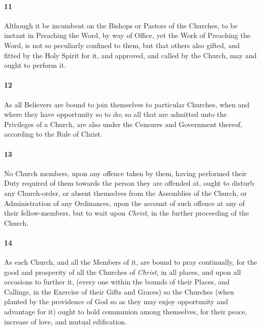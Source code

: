 \documentclass[
    paper=letterpaper,
    11pt,
    twoside,
    DIV=calc,
    openany
]{scrbook}
\newcommand{\oldgrammar}[2]{#2}
\begin{document}
\paragraph{11} %
Although it be incumbent on the Bishops or Pastors of the Churches, to be instant in Preaching the Word, by way of Office, yet the Work of Preaching the Word, is not so peculiarly confined to them, but that others also \R{}gifted, and fitted by the Holy Spirit for it, and approved, and called by the Church, may and ought to perform it.

\footnotebegin
{}
\footnoteend

\paragraph{12} %
As all Believers are bound to \oldgrammar{joyn}{join} themselves to particular Churches, when and where they have opportunity so to do; so all that are admitted unto the Privileges of a Church, are also \R{}under the Censures and Government thereof, according to the Rule of Christ.

\footnotebegin
{}
\footnoteend

\paragraph{13} %
No Church members, upon any offence taken by them, having performed their Duty required of them towards the person they are offended at, ought to disturb any Church-order, or absent themselves from the Assemblies of the Church, or Administration of any Ordinances, upon the account of such offence at any of their fellow-members, but to wait upon \textit{Christ}, \R{}in the further proceeding of the Church.

\footnotebegin
{}
\footnoteend

\paragraph{14} %
As each Church, and all the Members of it, are bound to \R{}pray continually, for the good and prosperity of all the Churches of \textit{Christ}, in all places, and upon all occasions to further it, (every one within the bounds of their Places, and Callings, in the Exercise of their Gifts and Graces) so the Churches (when planted by the providence of God so as they may \oldgrammar{injoy}{enjoy} opportunity and advantage for it) ought to hold \R{}communion among themselves, for their peace, increase of love, and mutual edification.
\end{document}
